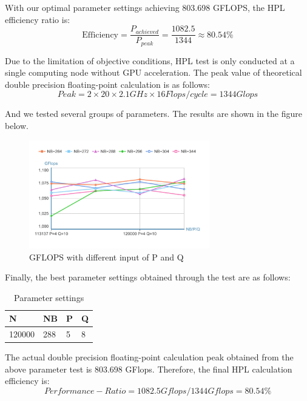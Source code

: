\documentclass[a4paper,12pt]{article}
\begin{document}
With our optimal parameter settings achieving 803.698 GFLOPS, the HPL efficiency ratio is:
\begin{equation}
    \text{Efficiency} = \frac{P_{achieved}}{P_{peak}} = \frac{1082.5}{1344} \approx 80.54\%
\end{equation}

Due to the limitation of objective conditions, HPL test is only conducted at a single computing node without GPU acceleration. The peak value of theoretical double precision floating-point calculation is as follows:
\begin{equation*}
Peak = 2 \times 20 \times 2.1GHz \times 16Flops/cycle = 1344Glops
\end{equation*}

And we tested several groups of parameters. The results are shown in the figure below.

\begin{figure}[H]
    \centering
    \includegraphics[width=0.7\textwidth]{GFLOPS_PQ_NB.png}
    \caption{GFLOPS with different input of P and Q}
    \label{fig:gflops_pq_nb}
\end{figure}

Finally, the best parameter settings obtained through the test are as follows:
\begin{table}[H]
\centering
\caption{Parameter settings}
\vspace{0.5cm}
\begin{tabular}{llll}
\toprule
N & NB & P & Q \\
\midrule
120000 & 288 & 5 & 8 \\
\bottomrule
\end{tabular}
\end{table}

The actual double precision floating-point calculation peak obtained from the above parameter test is 803.698 GFlops. Therefore, the final HPL calculation efficiency is:
\begin{equation*}
Performance-Ratio = 1082.5Gflops/1344Gflops = 80.54\%
\end{equation*}
\end{document}
